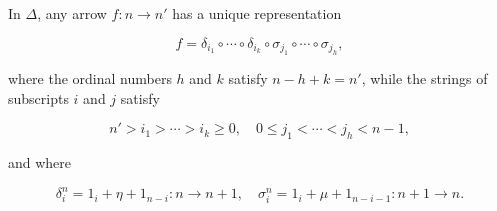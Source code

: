 In $\Delta$, any arrow $f : n \rightarrow n'$ has a unique representation

$$f = \delta_{i_1} \circ \cdots \circ \delta_{i_k} \circ \sigma_{j_1} \circ \cdots \circ \sigma_{j_h},$$

where the ordinal numbers $h$ and $k$ satisfy $n - h + k = n'$, while the strings of subscripts $i$ and $j$ satisfy

$$n' > i_1 > \cdots > i_k \geq 0, \quad 0 \leq j_1 < \cdots < j_h < n-1,$$

and where

$$\delta_i^n = 1_i + \eta + 1_{n-i} : n \rightarrow n+1, \quad \sigma_i^n = 1_i + \mu + 1_{n-i-1} : n+1 \rightarrow n.$$
